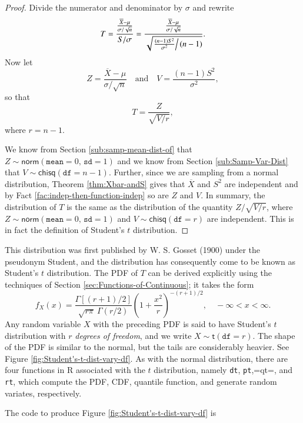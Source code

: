 \documentclass[captions=tableheading]{scrbook}
\begin{document}
\begin{proof}
Divide the numerator and denominator by \(\sigma\) and rewrite
\[
T=\frac{\frac{\overline{X}-\mu}{\sigma/\sqrt{n}}}{S/\sigma}=\frac{\frac{\overline{X}-\mu}{\sigma/\sqrt{n}}}{\sqrt{\left.\frac{(n-1)S^{2}}{\sigma^{2}}\right\slash (n-1)}}.
\]
Now let 
\[
Z=\frac{\overline{X}-\mu}{\sigma/\sqrt{n}}\quad\mbox{and}\quad V=\frac{(n-1)S^{2}}{\sigma^{2}},
\]
so that
\begin{equation}
T=\frac{Z}{\sqrt{V/r}},
\end{equation}
where \(r=n-1\).

We know from Section \ref{sub:samp-mean-dist-of} that \(Z\sim\mathsf{norm}(\mathtt{mean}=0,\,\mathtt{sd}=1)\) and we know from Section \ref{sub:Samp-Var-Dist} that \(V\sim\mathsf{chisq}(\mathtt{df}=n-1)\). Further, since we are sampling from a normal distribution, Theorem \ref{thm:Xbar-andS} gives that \(\overline{X}\) and \(S^{2}\) are independent and by Fact \ref{fac:indep-then-function-indep} so are \(Z\) and \(V\). In summary, the distribution of \(T\) is the same as the distribution of the quantity \(Z/\sqrt{V/r}\), where \(Z\sim\mathsf{norm}(\mathtt{mean}=0,\,\mathtt{sd}=1)\) and \(V\sim\mathsf{chisq}(\mathtt{df}=r)\) are independent. This is in fact the definition of Student's \(t\) distribution.
\end{proof}

This distribution was first published by W. S. Gosset (1900) under the pseudonym Student, and the distribution has consequently come to be known as Student's \(t\) distribution. The PDF of \(T\) can be derived explicitly using the techniques of Section \ref{sec:Functions-of-Continuous}; it takes the form 
\begin{equation}
f_{X}(x)=\frac{\Gamma[(r+1)/2]}{\sqrt{r\pi}\ \Gamma(r/2)}\left(1+\frac{x^{2}}{r}\right)^{-(r+1)/2},\quad-\infty<x<\infty.
\end{equation}
Any random variable \(X\) with the preceding PDF is said to have Student's \(t\) distribution with \(r\) \emph{degrees of freedom}, and we write \(X\sim\mathsf{t}(\mathtt{df}=r)\). The shape of the PDF is similar to the normal, but the tails are considerably heavier. See Figure \ref{fig:Student's-t-dist-vary-df}. As with the normal distribution, there are four functions in \textsf{R} associated with the \(t\) distribution, namely \texttt{dt}, \texttt{pt},=qt=, and \texttt{rt}, which compute the PDF, CDF, quantile function, and generate random variates, respectively.


The code to produce Figure \ref{fig:Student's-t-dist-vary-df} is
\end{document}
